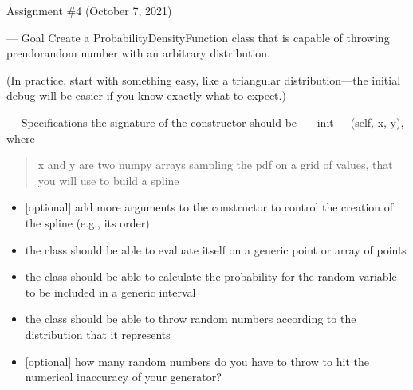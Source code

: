 \documentclass[letterpaper,10pt,english]{sphinxmanual}
\begin{document}
\begin{description}
\sphinxAtStartPar
Assignment \#4 (October 7, 2021)

\sphinxAtStartPar
— Goal
Create a ProbabilityDensityFunction class that is capable of throwing
preudo\sphinxhyphen{}random number with an arbitrary distribution.

\sphinxAtStartPar
(In practice, start with something easy, like a triangular distribution—the
initial debug will be easier if you know exactly what to expect.)

\sphinxAtStartPar
— Specifications
\sphinxhyphen{} the signature of the constructor should be \_\_init\_\_(self, x, y), where
\begin{quote}

\sphinxAtStartPar
x and y are two numpy arrays sampling the pdf on a grid of values, that
you will use to build a spline
\end{quote}
\begin{itemize}
\item {} 
\sphinxAtStartPar
{[}optional{]} add more arguments to the constructor to control the creation
of the spline (e.g., its order)

\item {} 
\sphinxAtStartPar
the class should be able to evaluate itself on a generic point or array of
points

\item {} 
\sphinxAtStartPar
the class should be able to calculate the probability for the random
variable to be included in a generic interval

\item {} 
\sphinxAtStartPar
the class should be able to throw random numbers according to the distribution
that it represents

\item {} 
\sphinxAtStartPar
{[}optional{]} how many random numbers do you have to throw to hit the
numerical inaccuracy of your generator?

\end{itemize}

\end{description}
\end{document}
